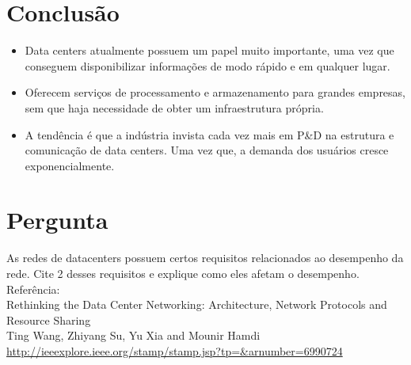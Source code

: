 \documentclass[aspectratio=169]{beamer}
\begin{document}
\section{Conclusão}
    \begin{frame} 
        \begin{itemize}
			\item
				Data centers atualmente possuem um papel muito importante, uma vez que conseguem disponibilizar informações de modo rápido e em qualquer lugar.
			\item
				Oferecem serviços de processamento e armazenamento para grandes empresas, sem que haja necessidade de obter um infraestrutura própria.
			\item
				A tendência é que a indústria invista cada vez mais em P\&D na estrutura e comunicação de data centers. Uma vez que, a demanda dos usuários cresce exponencialmente.
		\end{itemize}
    \end{frame}
        
\section{Pergunta}
    \begin{frame} 
        As redes de datacenters possuem certos requisitos relacionados ao desempenho da rede. Cite 2 desses requisitos e explique como eles afetam o desempenho.\\ 
\hfill \break
		Referência: \\
		Rethinking the Data Center Networking: Architecture, Network Protocols and Resource Sharing\\
\hfill \break
		Ting Wang, Zhiyang Su, Yu Xia and Mounir Hamdi\\
\hfill \break
		\href{http://ieeexplore.ieee.org/stamp/stamp.jsp?tp=\&arnumber=6990724}{http://ieeexplore.ieee.org/stamp/stamp.jsp?tp=\&arnumber=6990724}
    \end{frame}
    
\end{document}
